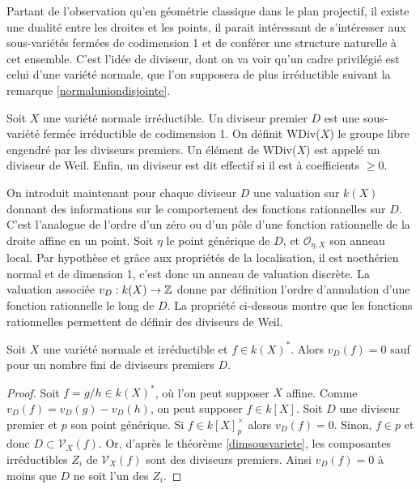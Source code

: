 Partant de l'observation qu'en géométrie classique dans le plan projectif, il existe une dualité entre les droites et les points, il parait intéressant de s'intéresser aux sous-variétés fermées de codimension 1 et de conférer une structure naturelle à cet ensemble. C'est l'idée de diviseur, dont on va voir qu'un cadre privilégié est celui d'une variété normale, que l'on supposera de plus irréductible suivant la remarque \ref{normaluniondisjointe}.

\begin{defn}
Soit $X$ une variété normale irréductible. Un diviseur premier $D$ est une sous-variété fermée irréductible de codimension 1. On définit WDiv($X$) le groupe libre engendré par les diviseurs premiers. Un élément de WDiv($X$) est appelé un diviseur de Weil. Enfin, un diviseur est dit effectif si il est à coefficients $\geq 0$. 
\end{defn}
On introduit maintenant pour chaque diviseur $D$ une valuation sur $k(X)$ donnant des informations sur le comportement des fonctions rationnelles sur $D$. C'est l'analogue de l'ordre d'un zéro ou d'un pôle d'une fonction rationnelle de la droite affine en un point. Soit $\eta$ le point générique de $D$, et $\mathcal{O}_{\eta,X}$ son anneau local. Par hypothèse et grâce aux propriétés de la localisation, il est noethérien normal et de dimension 1, c'est donc un anneau de valuation discrète. La valuation associée $v_D:k(X)\rightarrow \mathbb{Z}$ donne par définition l'ordre d'annulation d'une fonction rationnelle le long de $D$. La propriété ci-dessous montre que les fonctions rationnelles permettent de définir des diviseurs de Weil.

\begin{prop}\label{noetherienPWDivBienDef}
Soit $X$ une variété normale et irréductible et $f\in k(X)^*$. Alors $v_D(f)=0$ sauf pour un nombre fini de diviseurs premiers $D$.
\end{prop}
\begin{proof}
Soit $f=g/h\in k(X)^*$, où l'on peut supposer $X$ affine. Comme $v_D(f)=v_D(g)-v_D(h)$, on peut supposer $f\in k[X]$. Soit $D$ une diviseur premier et $p$ son point générique. Si $f\in k[X]_p^\times$ alors $v_D(f)=0$. Sinon, $f\in p$ et donc $D \subset \mathcal{V}_X(f)$. Or, d'après le théorème \ref{dimsousvariete}, les composantes irréductibles $Z_i$ de $\mathcal{V}_X(f)$ sont des diviseurs premiers. Ainsi $v_D(f)=0$ à moins que $D$ ne soit l'un des $Z_i$.
\end{proof}

